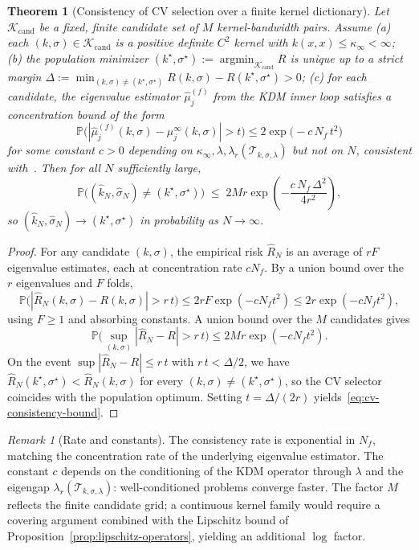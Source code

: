 \documentclass[11pt]{article}
\newtheorem{theorem}{Theorem}
\theoremstyle{remark}
\newtheorem{remark}{Remark}[section]
\begin{document}
\begin{theorem}[Consistency of CV selection over a finite kernel dictionary]
\label{thm:cv-consistency}
Let $\mathcal{K}_\text{cand}$ be a \emph{fixed, finite} candidate set of $M$ kernel-bandwidth pairs.
Assume (a) each $(k,\sigma)\in\mathcal{K}_\text{cand}$ is a positive definite $C^2$ kernel with $k(x,x)\le\kappa_\infty<\infty$; (b) the population minimizer $(k^\star,\sigma^\star):=\operatorname*{argmin}_{\mathcal{K}_\text{cand}} R$ is unique up to a strict margin $\Delta:=\min_{(k,\sigma)\ne(k^\star,\sigma^\star)} R(k,\sigma)-R(k^\star,\sigma^\star)>0$; (c) for each candidate, the eigenvalue estimator $\widehat\mu_j^{(f)}$ from the KDM inner loop satisfies a concentration bound of the form
\[
\mathbb{P}\bigl(|\widehat\mu_j^{(f)}(k,\sigma)-\mu_j^\infty(k,\sigma)| > t\bigr) \le 2\exp\!\bigl(-c\, N_f\, t^2\bigr)
\]
for some constant $c>0$ depending on $\kappa_\infty,\lambda,\lambda_r(\mathcal{T}_{k,\sigma,\lambda})$ but not on $N$, consistent with~\citet[Theorem 4.4]{pmlr-v195-pillaud-vivien23a}.
Then for all $N$ sufficiently large,
\begin{equation}
\label{eq:cv-consistency-bound}
\mathbb{P}\bigl((\hat k_N,\hat\sigma_N) \ne (k^\star,\sigma^\star)\bigr)
\;\le\;
2Mr\exp\!\left(-\frac{c\, N_f\, \Delta^2}{4r^2}\right),
\end{equation}
so $(\hat k_N,\hat\sigma_N) \to (k^\star,\sigma^\star)$ in probability as $N\to\infty$.
\end{theorem}

\begin{proof}
For any candidate $(k,\sigma)$, the empirical risk $\widehat{R}_N$ is an average of $rF$ eigenvalue estimates, each at concentration rate $c N_f$.
By a union bound over the $r$ eigenvalues and $F$ folds,
\[
\mathbb{P}\bigl(|\widehat{R}_N(k,\sigma)-R(k,\sigma)|>r\,t\bigr)\le 2rF\exp(-cN_f t^2)\le 2r\exp(-cN_f t^2),
\]
using $F\ge 1$ and absorbing constants. A union bound over the $M$ candidates gives
\[
\mathbb{P}\bigl(\sup_{(k,\sigma)}|\widehat{R}_N-R|>r\,t\bigr)\le 2Mr\exp(-cN_f t^2).
\]
On the event $\sup|\widehat{R}_N-R|\le r\,t$ with $r\,t<\Delta/2$, we have $\widehat{R}_N(k^\star,\sigma^\star) < \widehat{R}_N(k,\sigma)$ for every $(k,\sigma)\ne(k^\star,\sigma^\star)$, so the CV selector coincides with the population optimum.
Setting $t=\Delta/(2r)$ yields~\eqref{eq:cv-consistency-bound}.
\end{proof}

\begin{remark}[Rate and constants]
The consistency rate is exponential in $N_f$, matching the concentration rate of the underlying eigenvalue estimator.
The constant $c$ depends on the conditioning of the KDM operator through $\lambda$ and the eigengap $\lambda_r(\mathcal{T}_{k,\sigma,\lambda})$: well-conditioned problems converge faster.
The factor $M$ reflects the finite candidate grid; a continuous kernel family would require a covering argument combined with the Lipschitz bound of Proposition~\ref{prop:lipschitz-operators}, yielding an additional $\log$ factor.
\end{remark}
\end{document}
